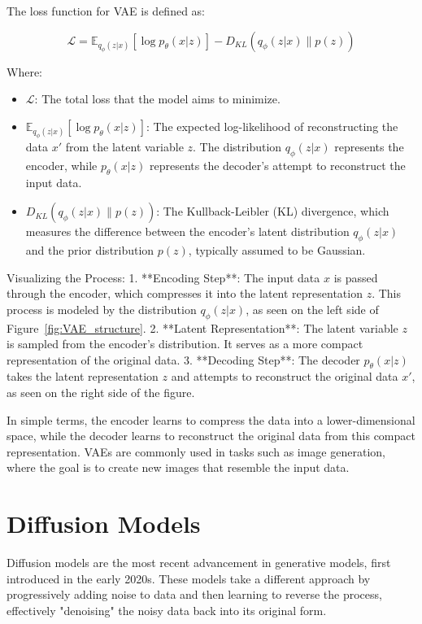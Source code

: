 The loss function for VAE is defined as:

\begin{equation}
\mathcal{L} = \mathbb{E}_{q_\phi(z|x)}[\log p_\theta(x|z)] - D_{KL}(q_\phi(z|x) \| p(z))
\end{equation}

Where:
\begin{itemize}
    \item \(\mathcal{L}\): The total loss that the model aims to minimize.
    \item \(\mathbb{E}_{q_\phi(z|x)}[\log p_\theta(x|z)]\): The expected log-likelihood of reconstructing the data \(x'\) from the latent variable \(z\). The distribution \(q_\phi(z|x)\) represents the encoder, while \(p_\theta(x|z)\) represents the decoder's attempt to reconstruct the input data.
    \item \(D_{KL}(q_\phi(z|x) \| p(z))\): The Kullback-Leibler (KL) divergence, which measures the difference between the encoder's latent distribution \(q_\phi(z|x)\) and the prior distribution \(p(z)\), typically assumed to be Gaussian.
\end{itemize}

Visualizing the Process:
1. **Encoding Step**: The input data \(x\) is passed through the encoder, which compresses it into the latent representation \(z\). This process is modeled by the distribution \(q_\phi(z|x)\), as seen on the left side of Figure~\ref{fig:VAE_structure}.
2. **Latent Representation**: The latent variable \(z\) is sampled from the encoder's distribution. It serves as a more compact representation of the original data.
3. **Decoding Step**: The decoder \(p_\theta(x|z)\) takes the latent representation \(z\) and attempts to reconstruct the original data \(x'\), as seen on the right side of the figure.

In simple terms, the encoder learns to compress the data into a lower-dimensional space, while the decoder learns to reconstruct the original data from this compact representation. VAEs are commonly used in tasks such as image generation, where the goal is to create new images that resemble the input data.



\section{Diffusion Models}

Diffusion models are the most recent advancement in generative models, first introduced in the early 2020s. These models take a different approach by progressively adding noise to data and then learning to reverse the process, effectively "denoising" the noisy data back into its original form.


